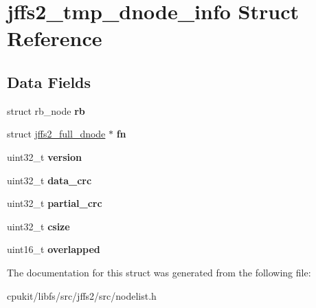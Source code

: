 \hypertarget{structjffs2__tmp__dnode__info}{}\section{jffs2\+\_\+tmp\+\_\+dnode\+\_\+info Struct Reference}
\label{structjffs2__tmp__dnode__info}
\subsection*{Data Fields}
\begin{DoxyCompactItemize}
\item 
\mbox{\label{structjffs2__tmp__dnode__info_ac26acd14eece4588e3b3aa73d6727437}} 
struct rb\+\_\+node {\bfseries rb}
\item 
\mbox{\label{structjffs2__tmp__dnode__info_ab06ba52536e240079acfe713334f16ff}} 
struct \mbox{\hyperlink{structjffs2__full__dnode}{jffs2\+\_\+full\+\_\+dnode}} $\ast$ {\bfseries fn}
\item 
\mbox{\label{structjffs2__tmp__dnode__info_acaba23545baf6b530d90ed5f26d97909}} 
uint32\+\_\+t {\bfseries version}
\item 
\mbox{\label{structjffs2__tmp__dnode__info_a78deb78bb2bf3c869b1dfbd66014f7cf}} 
uint32\+\_\+t {\bfseries data\+\_\+crc}
\item 
\mbox{\label{structjffs2__tmp__dnode__info_a820189df03902576c06f7b5db6e2ddc3}} 
uint32\+\_\+t {\bfseries partial\+\_\+crc}
\item 
\mbox{\label{structjffs2__tmp__dnode__info_a90d2073cfe8fa95b5294502b6be4eab7}} 
uint32\+\_\+t {\bfseries csize}
\item 
\mbox{\label{structjffs2__tmp__dnode__info_ac60cd7fdfd6fb970384c782bce8f9803}} 
uint16\+\_\+t {\bfseries overlapped}
\end{DoxyCompactItemize}


The documentation for this struct was generated from the following file\+:\begin{DoxyCompactItemize}
\item 
cpukit/libfs/src/jffs2/src/nodelist.\+h\end{DoxyCompactItemize}
